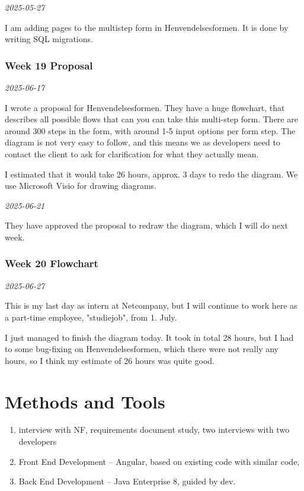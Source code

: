 \documentclass[../main.tex]{subfiles}
\begin{document}
\noindent \textit{2025-05-27}

I am adding pages to the multistep form in Henvendelsesformen. It is done by writing SQL migrations. 
\subsubsection{Week 19 Proposal}

\noindent \textit{2025-06-17}

I wrote a proposal for Henvendelsesformen. They have a huge flowchart, that describes all possible flows that can you can take this multi-step form. There are around 300 steps in the form, with around 1-5 input options per form step. The diagram is not very easy to follow, and this means we as developers need to contact the client to ask for clarification for what they actually mean. 

I estimated that it would take 26 hours, approx. 3 days to redo the diagram. We use Microsoft Visio for drawing diagrams.
\medskip

\noindent \textit{2025-06-21}

They have approved the proposal to redraw the diagram, which I will do next week.

\subsubsection{Week 20 Flowchart}

\noindent \textit{2025-06-27}

This is my last day as intern at Netcompany, but I will continue to work here as a part-time employee, "studiejob", from 1. July. 

I just managed to finish the diagram today. It took in total 28 hours, but I had to some bug-fixing on Henvendelsesformen, which there were not really any hours, so I think my estimate of 26 hours was quite good. 

\section{Methods and Tools}

\begin{enumerate}
\item interview with NF, requirements document study, two interviews with two developers 
\item Front End Development – Angular, based on existing code with similar code,  
\item Back End Development – Java Enterprise 8, guided by dev. 
\end{enumerate}
\end{document}
